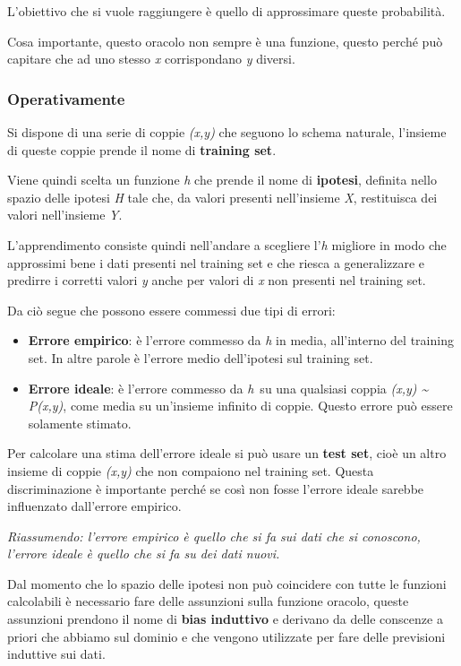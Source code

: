 L'obiettivo che si vuole raggiungere è quello di approssimare queste
probabilità.

Cosa importante, questo oracolo non sempre è una funzione, questo perché
può capitare che ad uno stesso \emph{x} corrispondano \emph{y} diversi.

\subsubsection{Operativamente}\label{operativamente}

Si dispone di una serie di coppie \emph{(x,y)} che seguono lo schema
naturale, l'insieme di queste coppie prende il nome di \textbf{training
set}.

Viene quindi scelta un funzione \emph{h} che prende il nome di
\textbf{ipotesi}, definita nello spazio delle ipotesi \emph{H} tale che,
da valori presenti nell'insieme \emph{X}, restituisca dei valori
nell'insieme \emph{Y}.

L'apprendimento consiste quindi nell'andare a scegliere l'\emph{h}
migliore in modo che approssimi bene i dati presenti nel training set e
che riesca a generalizzare e predirre i corretti valori \emph{y} anche
per valori di \emph{x} non presenti nel training set.

Da ciò segue che possono essere commessi due tipi di errori:

\begin{itemize}
\tightlist
\item
  \textbf{Errore empirico}: è l'errore commesso da \emph{h} in media,
  all'interno del training set. In altre parole è l'errore medio
  dell'ipotesi sul training set.
\item
  \textbf{Errore ideale}: è l'errore commesso da \emph{h}~su una
  qualsiasi coppia \emph{(x,y) \textasciitilde{} P(x,y)}, come media su
  un'insieme infinito di coppie. Questo errore può essere solamente
  stimato.
\end{itemize}

Per calcolare una stima dell'errore ideale si può usare un \textbf{test
set}, cioè un altro insieme di coppie \emph{(x,y)} che non compaiono nel
training set. Questa discriminazione è importante perché se così non
fosse l'errore ideale sarebbe influenzato dall'errore empirico.

\emph{Riassumendo: l'errore empirico è quello che si fa sui dati che si
conoscono, l'errore ideale è quello che si fa su dei dati nuovi.}

Dal momento che lo spazio delle ipotesi non può coincidere con tutte le
funzioni calcolabili è necessario fare delle assunzioni sulla funzione
oracolo, queste assunzioni prendono il nome di \textbf{bias induttivo} e
derivano da delle conscenze a priori che abbiamo sul dominio e che
vengono utilizzate per fare delle previsioni induttive sui dati.

